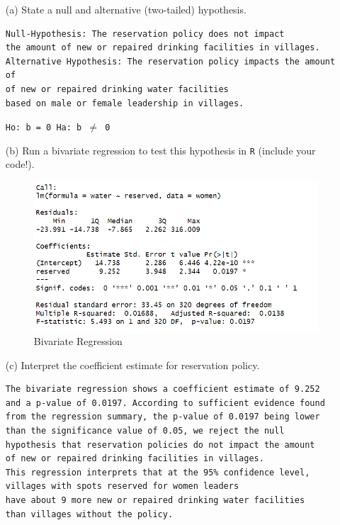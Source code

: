 \documentclass[12pt,letterpaper]{article}
\begin{document}
\newpage
\begin{enumerate}
	\item [(a)] State a null and alternative (two-tailed) hypothesis. 
\begin{Verbatim}
Null-Hypothesis: The reservation policy does not impact 
the amount of new or repaired drinking facilities in villages.
Alternative Hypothesis: The reservation policy impacts the amount of
of new or repaired drinking water facilities 
based on male or female leadership in villages. 
\end{Verbatim}
\texttt{Ho: b = 0  Ha: b $\neq$ 0}

\item [(b)]Run a bivariate regression to test this hypothesis in \texttt{R} (include your code!).
\begin{figure}[h!]\centering
	\caption{\footnotesize Bivariate Regression}
	\label{fig:bireg}
	\includegraphics[width=.85\textwidth]{bireg.png}
\end{figure}
  
\item [(c)] Interpret the coefficient estimate for reservation policy. 
\begin{Verbatim}
The bivariate regression shows a coefficient estimate of 9.252 
and a p-value of 0.0197. According to sufficient evidence found 
from the regression summary, the p-value of 0.0197 being lower
than the significance value of 0.05, we reject the null
hypothesis that reservation policies do not impact the amount 
of new or repaired drinking facilities in villages.
This regression interprets that at the 95% confidence level, 
villages with spots reserved for women leaders
have about 9 more new or repaired drinking water facilities 
than villages without the policy. 
\end{Verbatim}
\end{enumerate}
\end{document}
